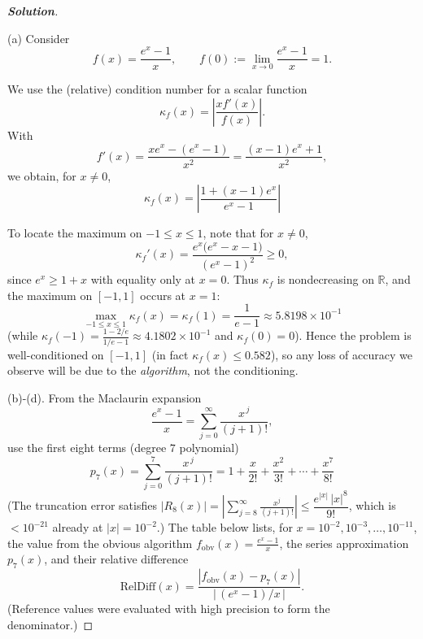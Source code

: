 \documentclass[11pt]{article}
\newenvironment{solution}{%
  \begin{proof}[\textbf{Solution}]$ $\par\nobreak\ignorespaces
}{%
  \end{proof}
}
\theoremstyle{definition}
\begin{document}
\begin{solution}


\noindent (a) Consider \[
f(x)=\frac{e^{x}-1}{x},\qquad f(0):=\lim_{x\to 0}\frac{e^{x}-1}{x}=1.
\]

We use the (relative) condition number for a scalar function
\[
\kappa_f(x)=\left|\frac{x f'(x)}{f(x)}\right|.
\]
With
\[
f'(x)=\frac{x e^{x}-(e^{x}-1)}{x^2}=\frac{(x-1)e^{x}+1}{x^2},
\]
we obtain, for $x\neq 0$,
\[
\boxed{\;\kappa_f(x)=\left|\frac{1+(x-1)e^{x}}{e^{x}-1}\right|\;}
\]

To locate the maximum on $-1\le x\le 1$, note that for $x\neq 0$,
\[
\kappa_f'(x)=\frac{e^{x}\bigl(e^{x}-x-1\bigr)}{(e^{x}-1)^{2}}\ge 0,
\]
since $e^{x}\ge 1+x$ with equality only at $x=0$. Thus $\kappa_f$ is nondecreasing on $\mathbb{R}$, and the maximum on $[-1,1]$ occurs at $x=1$:
\[
\boxed{\;\max_{-1\le x\le 1}\kappa_f(x)=\kappa_f(1)=\frac{1}{e-1}\approx 5.8198\times 10^{-1}\;}
\]
(while $\kappa_f(-1)=\frac{1-2/e}{1/e-1}\approx 4.1802\times 10^{-1}$ and $\kappa_f(0)=0$). 
Hence the problem is well-conditioned on $[-1,1]$ (in fact $\kappa_f(x)\le 0.582$), so any loss of accuracy we observe will be due to the \emph{algorithm}, not the conditioning.

\noindent (b)-(d). From the Maclaurin expansion
\[
\frac{e^{x}-1}{x}=\sum_{j=0}^{\infty}\frac{x^{\,j}}{(j+1)!},
\]
use the first eight terms (degree $7$ polynomial)
\[
\boxed{\;p_7(x)=\sum_{j=0}^{7}\frac{x^{\,j}}{(j+1)!}
=1+\frac{x}{2!}+\frac{x^{2}}{3!}+\cdots+\frac{x^{7}}{8!}\;}
\]
(The truncation error satisfies $|R_8(x)|=\left|\sum_{j=8}^\infty \frac{x^{j}}{(j+1)!}\right|
\le \dfrac{e^{|x|}\,|x|^{8}}{9!}$, which is $<10^{-21}$ already at $|x|=10^{-2}$.)
The table below lists, for $x=10^{-2},10^{-3},\dots,10^{-11}$, the value from the obvious algorithm
$f_{\text{obv}}(x)=\frac{e^x-1}{x}$, the series approximation $p_7(x)$, and their
relative difference
\[
\mathrm{RelDiff}(x)=\frac{|f_{\text{obv}}(x)-p_7(x)|}{\bigl|\,(e^x-1)/x\,\bigr|}.
\]
(Reference values were evaluated with high precision to form the denominator.)


\end{solution}
\end{document}
